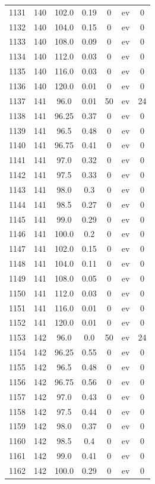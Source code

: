 \documentclass[12pt,a4paper]{article}
\begin{document}
\begin{tabular}{r|cccccc}
	1131 & 140 & 102.0 & 0.19 & 0 & ev & 0 \\
	1132 & 140 & 104.0 & 0.15 & 0 & ev & 0 \\
	1133 & 140 & 108.0 & 0.09 & 0 & ev & 0 \\
	1134 & 140 & 112.0 & 0.03 & 0 & ev & 0 \\
	1135 & 140 & 116.0 & 0.03 & 0 & ev & 0 \\
	1136 & 140 & 120.0 & 0.01 & 0 & ev & 0 \\
	1137 & 141 & 96.0 & 0.01 & 50 & ev & 24 \\
	1138 & 141 & 96.25 & 0.37 & 0 & ev & 0 \\
	1139 & 141 & 96.5 & 0.48 & 0 & ev & 0 \\
	1140 & 141 & 96.75 & 0.41 & 0 & ev & 0 \\
	1141 & 141 & 97.0 & 0.32 & 0 & ev & 0 \\
	1142 & 141 & 97.5 & 0.33 & 0 & ev & 0 \\
	1143 & 141 & 98.0 & 0.3 & 0 & ev & 0 \\
	1144 & 141 & 98.5 & 0.27 & 0 & ev & 0 \\
	1145 & 141 & 99.0 & 0.29 & 0 & ev & 0 \\
	1146 & 141 & 100.0 & 0.2 & 0 & ev & 0 \\
	1147 & 141 & 102.0 & 0.15 & 0 & ev & 0 \\
	1148 & 141 & 104.0 & 0.11 & 0 & ev & 0 \\
	1149 & 141 & 108.0 & 0.05 & 0 & ev & 0 \\
	1150 & 141 & 112.0 & 0.03 & 0 & ev & 0 \\
	1151 & 141 & 116.0 & 0.01 & 0 & ev & 0 \\
	1152 & 141 & 120.0 & 0.01 & 0 & ev & 0 \\
	1153 & 142 & 96.0 & 0.0 & 50 & ev & 24 \\
	1154 & 142 & 96.25 & 0.55 & 0 & ev & 0 \\
	1155 & 142 & 96.5 & 0.48 & 0 & ev & 0 \\
	1156 & 142 & 96.75 & 0.56 & 0 & ev & 0 \\
	1157 & 142 & 97.0 & 0.43 & 0 & ev & 0 \\
	1158 & 142 & 97.5 & 0.44 & 0 & ev & 0 \\
	1159 & 142 & 98.0 & 0.37 & 0 & ev & 0 \\
	1160 & 142 & 98.5 & 0.4 & 0 & ev & 0 \\
	1161 & 142 & 99.0 & 0.41 & 0 & ev & 0 \\
	1162 & 142 & 100.0 & 0.29 & 0 & ev & 0 \\

\end{tabular}
\end{document}
